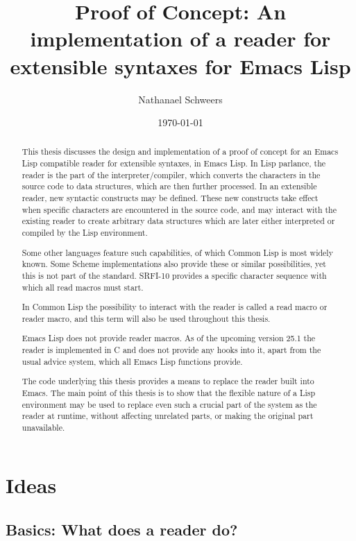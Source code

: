 \documentclass[a4paper]{article}
\author{Nathanael Schweers}
\date{\today}
\title{Proof of Concept: An implementation of a reader for extensible syntaxes for Emacs Lisp}
\begin{document}
\maketitle
\tableofcontents

\begin{abstract}
This thesis discusses the design and implementation of a proof of concept for
an Emacs Lisp compatible reader for extensible syntaxes, in Emacs Lisp.  In Lisp
parlance, the reader is the part of the interpreter/compiler, which converts
the characters in the source code to data structures, which are then further
processed.  In an extensible reader, new syntactic constructs may be defined.
These new constructs take effect when specific characters are encountered in
the source code, and may interact with the existing reader to create arbitrary
data structures which are later either interpreted or compiled by the Lisp
environment.

Some other languages feature such capabilities, of which Common Lisp is most
widely known.  Some Scheme implementations also provide these or similar
possibilities, yet this is not part of the standard.  SRFI-10 provides a
specific character sequence with which all read macros must start.

In Common Lisp the possibility to interact with the reader is called a read macro or
reader macro, and this term will also be used throughout this thesis.

Emacs Lisp does not provide reader macros.  As of the upcoming version 25.1 the
reader is implemented in C and does not provide any hooks into it, apart from
the usual advice system, which all Emacs Lisp functions provide.

The code underlying this thesis provides a means to replace the reader built
into Emacs.  The main point of this thesis is to show that the flexible nature
of a Lisp environment may be used to replace even such a crucial part of the
system as the reader at runtime, without affecting unrelated parts, or making
the original part unavailable.
\end{abstract}

\section{Ideas}
\label{sec:orgheadline6}
\subsection{Basics: What does a reader do?}
\label{sec:orgheadline3}
\end{document}
